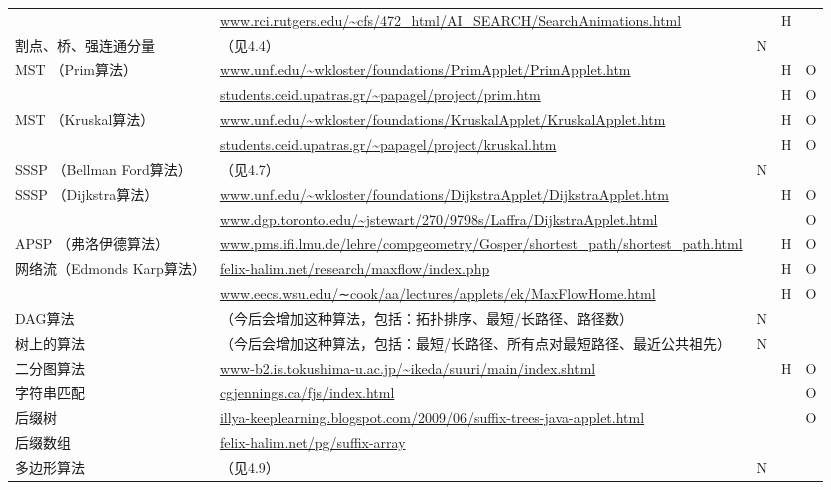 \begin{center}
\begin{longtable}{p{4cm} p{8cm} l l l}
& \url{www.rci.rutgers.edu/~cfs/472_html/AI_SEARCH/SearchAnimations.html} & & H & \\
割点、桥、强连通分量 & （见4.4） & N & & \\
{MST （Prim算法）} & \url{www.unf.edu/~wkloster/foundations/PrimApplet/PrimApplet.htm} & & H & O \\
& \url{students.ceid.upatras.gr/~papagel/project/prim.htm} & & H & O \\
{MST （Kruskal算法）} & \url{www.unf.edu/~wkloster/foundations/KruskalApplet/KruskalApplet.htm} & & H & O \\
& \url{students.ceid.upatras.gr/~papagel/project/kruskal.htm} & & H & O \\
SSSP （Bellman Ford算法）& （见4.7） & N & & \\
{SSSP （Dijkstra算法）} & \url{www.unf.edu/~wkloster/foundations/DijkstraApplet/DijkstraApplet.htm} & & H & O \\
& \url{www.dgp.toronto.edu/~jstewart/270/9798s/Laffra/DijkstraApplet.html} & & & O \\
APSP （弗洛伊德算法） & \url{www.pms.ifi.lmu.de/lehre/compgeometry/Gosper/shortest_path/shortest_path.html} & & H & O \\
网络流（Edmonds Karp算法） & \url{felix-halim.net/research/maxflow/index.php} & & H & O \\
&\url{www.eecs.wsu.edu/∼cook/aa/lectures/applets/ek/MaxFlowHome.html} & & H & O \\
DAG算法 & （今后会增加这种算法，包括：拓扑排序、最短/长路径、路径数） & N & & \\
树上的算法 & （今后会增加这种算法，包括：最短/长路径、所有点对最短路径、最近公共祖先） & N & & \\
二分图算法 & \url{www-b2.is.tokushima-u.ac.jp/~ikeda/suuri/main/index.shtml} & & H & O \\
字符串匹配 & \url{cgjennings.ca/fjs/index.html} & & & O \\
{后缀树} & \url{illya-keeplearning.blogspot.com/2009/06/suffix-trees-java-applet.html} & & & O \\
后缀数组 & \url{felix-halim.net/pg/suffix-array} & & & \\
多边形算法 & （见4.9） & N & & \\

\end{longtable}
\end{center}
